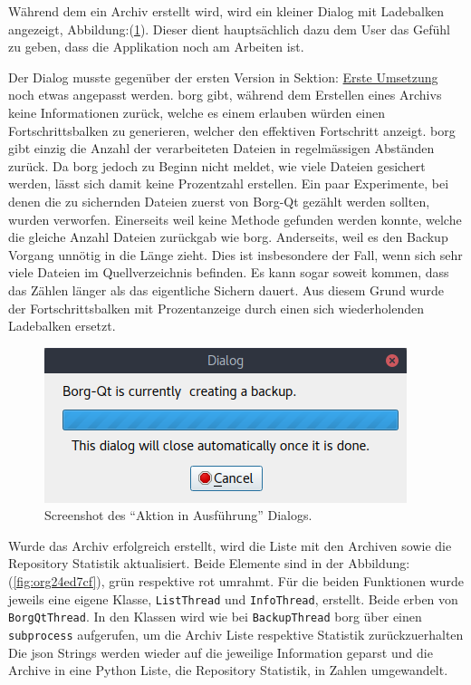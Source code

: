 Während dem ein Archiv erstellt wird, wird ein kleiner Dialog mit Ladebalken
angezeigt, Abbildung:(\ref{fig:org52ca607}). Dieser dient hauptsächlich dazu
dem User das Gefühl zu geben, dass die Applikation noch am Arbeiten ist.

Der Dialog musste gegenüber der ersten Version in Sektion: \hyperref[sec:org040cd93]{Erste Umsetzung} noch
etwas angepasst werden. \gls{borg} gibt, während dem Erstellen eines Archivs
keine Informationen zurück, welche es einem erlauben würden einen
Fortschrittsbalken zu generieren, welcher den effektiven Fortschritt anzeigt.
\gls{borg} gibt einzig die Anzahl der verarbeiteten Dateien in regelmässigen
Abständen zurück. Da \gls{borg} jedoch zu Beginn nicht meldet, wie viele Dateien
gesichert werden, lässt sich damit keine Prozentzahl erstellen. Ein paar
Experimente, bei denen die zu sichernden Dateien zuerst von Borg-Qt gezählt
werden sollten, wurden verworfen. Einerseits weil keine Methode gefunden werden
konnte, welche die gleiche Anzahl Dateien zurückgab wie \gls{borg}. Anderseits,
weil es den Backup Vorgang unnötig in die Länge zieht. Dies ist insbesondere
der Fall, wenn sich sehr viele Dateien im Quellverzeichnis befinden. Es kann
sogar soweit kommen, dass das Zählen länger als das eigentliche Sichern dauert.
Aus diesem Grund wurde der Fortschrittsbalken mit Prozentanzeige durch einen
sich wiederholenden Ladebalken ersetzt.

\begin{figure}
\centering
\includegraphics[width=.4\paperwidth]{pictures/borgqt_progress_v2.png}
\caption{\label{fig:org52ca607}
Screenshot des "`Aktion in Ausführung"' Dialogs.}
\end{figure}

Wurde das Archiv erfolgreich erstellt, wird die Liste mit den Archiven sowie
die Repository Statistik aktualisiert. Beide Elemente sind in der
Abbildung:(\ref{fig:org24ed7cf}), grün respektive rot umrahmt. Für die
beiden Funktionen wurde jeweils eine eigene Klasse, \texttt{ListThread} und
\texttt{InfoThread}, erstellt. Beide erben von \texttt{BorgQtThread}. In den Klassen wird wie
bei \texttt{BackupThread} \gls{borg} über einen \texttt{subprocess} aufgerufen, um die Archiv Liste
respektive Statistik zurückzuerhalten Die \gls{json} Strings werden wieder auf
die jeweilige Information geparst und die Archive in eine Python Liste, die
Repository Statistik, in Zahlen umgewandelt.
\newpage

